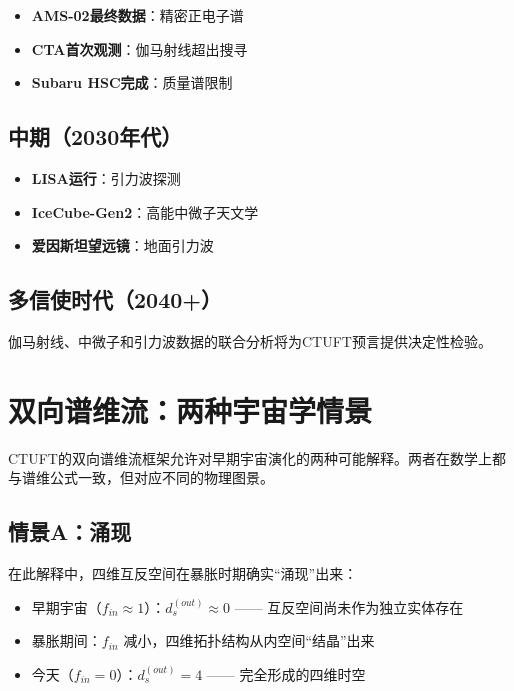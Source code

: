 \begin{itemize}
    \item \textbf{AMS-02最终数据}：精密正电子谱
    \item \textbf{CTA首次观测}：伽马射线超出搜寻
    \item \textbf{Subaru HSC完成}：质量谱限制
\end{itemize}

\subsection{中期（2030年代）}
\label{subsec:medium-term}

\begin{itemize}
    \item \textbf{LISA运行}：引力波探测
    \item \textbf{IceCube-Gen2}：高能中微子天文学
    \item \textbf{爱因斯坦望远镜}：地面引力波
\end{itemize}

\subsection{多信使时代（2040+）}
\label{subsec:multi-messenger}

伽马射线、中微子和引力波数据的联合分析将为CTUFT预言提供决定性检验。

\section{双向谱维流：两种宇宙学情景}
\label{sec:two-scenarios}

CTUFT的双向谱维流框架允许对早期宇宙演化的两种可能解释。两者在数学上都与谱维公式一致，但对应不同的物理图景。

\subsection{情景A：涌现}
\label{subsec:scenario-emergence}

在此解释中，四维互反空间在暴胀时期确实``涌现''出来：
\begin{itemize}
    \item 早期宇宙（$f_{in} \approx 1$）：$d_s^{(out)} \approx 0$ —— 互反空间尚未作为独立实体存在
    \item 暴胀期间：$f_{in}$ 减小，四维拓扑结构从内空间``结晶''出来
    \item 今天（$f_{in} = 0$）：$d_s^{(out)} = 4$ —— 完全形成的四维时空
\end{itemize}

